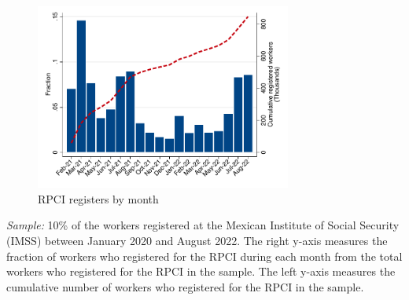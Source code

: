 \documentclass[oneside,11pt]{article}
\begin{document}

\begin{figure}[H]
    \caption{RPCI registers by month}
    \label{hist_download}
    \begin{center}
    \includegraphics[width=0.75\textwidth]{04_Figures/muestra_1porciento/hist_download_month.pdf}
    \end{center}
\end{figure}
\scriptsize{
\noindent \textit{Sample:} 10\% of the workers registered at the Mexican Institute of Social Security (IMSS) between January 2020 and August 2022. The right y-axis measures the fraction of workers who registered for the RPCI during each month from the total workers who registered for the RPCI in the sample. The left y-axis measures the cumulative number of workers who registered for the RPCI in the sample.
}
\end{document}
